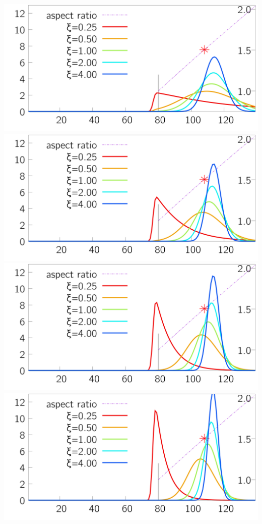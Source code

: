 \begin{minipage}{0.25\textwidth} 
 \includegraphics[width=\textwidth ]{../plots_size-distribution_png/plot_size-distribution_eagg3-ki1__xi.png}
\includegraphics[width=\textwidth ]{../plots_size-distribution_png/plot_size-distribution_eagg3-ki2__xi.png}
\includegraphics[width=\textwidth ]{../plots_size-distribution_png/plot_size-distribution_eagg3-ki3__xi.png}
\includegraphics[width=\textwidth ]{../plots_size-distribution_png/plot_size-distribution_eagg3-ki4__xi.png}
\end{minipage}%
